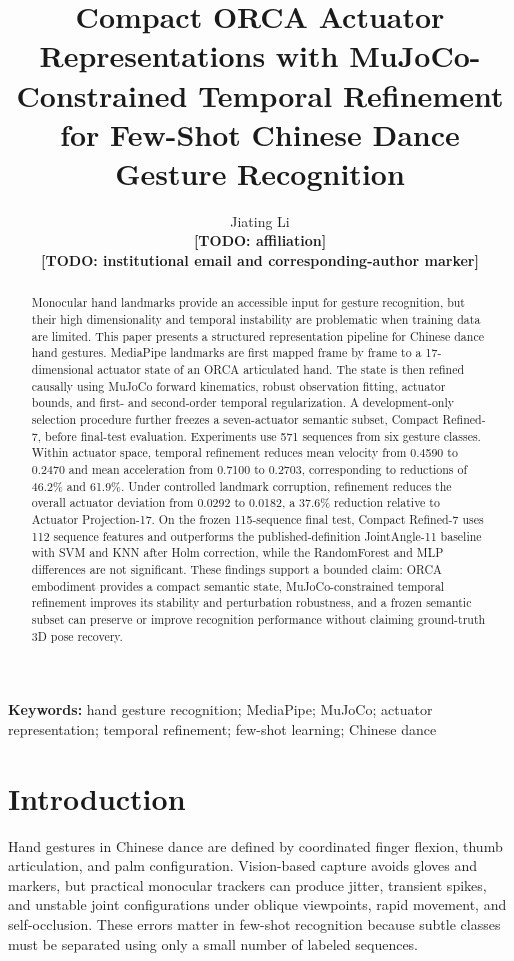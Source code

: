 \documentclass[11pt]{article}
\title{Compact ORCA Actuator Representations with MuJoCo-Constrained Temporal Refinement for Few-Shot Chinese Dance Gesture Recognition}
\author{Jiating Li\\\small \textbf{[TODO: affiliation]}\\\small \textbf{[TODO: institutional email and corresponding-author marker]}}
\date{}
\begin{document}
\maketitle

\begin{abstract}
Monocular hand landmarks provide an accessible input for gesture recognition, but their high dimensionality and temporal instability are problematic when training data are limited. This paper presents a structured representation pipeline for Chinese dance hand gestures. MediaPipe landmarks are first mapped frame by frame to a 17-dimensional actuator state of an ORCA articulated hand. The state is then refined causally using MuJoCo forward kinematics, robust observation fitting, actuator bounds, and first- and second-order temporal regularization. A development-only selection procedure further freezes a seven-actuator semantic subset, Compact Refined-7, before final-test evaluation. Experiments use 571 sequences from six gesture classes. Within actuator space, temporal refinement reduces mean velocity from 0.4590 to 0.2470 and mean acceleration from 0.7100 to 0.2703, corresponding to reductions of 46.2\% and 61.9\%. Under controlled landmark corruption, refinement reduces the overall actuator deviation from 0.0292 to 0.0182, a 37.6\% reduction relative to Actuator Projection-17. On the frozen 115-sequence final test, Compact Refined-7 uses 112 sequence features and outperforms the published-definition JointAngle-11 baseline with SVM and KNN after Holm correction, while the RandomForest and MLP differences are not significant. These findings support a bounded claim: ORCA embodiment provides a compact semantic state, MuJoCo-constrained temporal refinement improves its stability and perturbation robustness, and a frozen semantic subset can preserve or improve recognition performance without claiming ground-truth 3D pose recovery.
\end{abstract}

\textbf{Keywords:} hand gesture recognition; MediaPipe; MuJoCo; actuator representation; temporal refinement; few-shot learning; Chinese dance

\section{Introduction}

Hand gestures in Chinese dance are defined by coordinated finger flexion, thumb articulation, and palm configuration. Vision-based capture avoids gloves and markers, but practical monocular trackers can produce jitter, transient spikes, and unstable joint configurations under oblique viewpoints, rapid movement, and self-occlusion. These errors matter in few-shot recognition because subtle classes must be separated using only a small number of labeled sequences.
\end{document}
